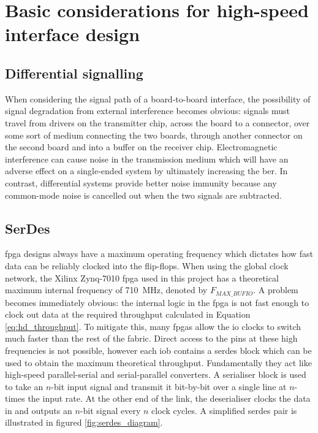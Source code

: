 \section{Basic considerations for high-speed interface design}

\subsection{Differential signalling}

When considering the signal path of a board-to-board interface, the possibility of signal degradation from external interference becomes obvious: signals must travel from drivers on the transmitter chip, across the board to a connector, over some sort of medium connecting the two boards, through another connector on the second board and into a buffer on the receiver chip. Electromagnetic interference can cause noise in the transmission medium which will have an adverse effect on a single-ended system by ultimately increasing the \gls{ber}. In contrast, differential systems provide better noise immunity because any common-mode noise is cancelled out when the two signals are subtracted.

\subsection{SerDes}
\gls{fpga} designs always have a maximum operating frequency which dictates how fast data can be reliably clocked into the flip-flops. When using the global clock network, the Xilinx Zynq-7010 \gls{fpga} used in this project has a theoretical maximum internal frequency of \SI{710}{\mega\hertz}, denoted by \(F_{MAX\_BUFIO}\)\cite{xilinx:ds187}. A problem becomes immediately obvious: the internal logic in the \gls{fpga} is not fast enough to clock out data at the required throughput calculated in Equation \ref{eq:hd_throughput}. To mitigate this, many \glspl{fpga} allow the \gls{io} clocks to switch much faster than the rest of the fabric. Direct access to the pins at these high frequencies is not possible, however each \gls{iob} contains a \gls{serdes} block which can be used to obtain the maximum theoretical throughput. Fundamentally they act like high-speed parallel-serial and serial-parallel converters. A serialiser block is used to take an \(n\)-bit input signal and transmit it bit-by-bit over a single line at \(n\)-times the input rate. At the other end of the link, the deserialiser clocks the data in and outputs an \(n\)-bit signal every \(n\) clock cycles. A simplified \gls{serdes} pair is illustrated in figured \ref{fig:serdes_diagram}.

